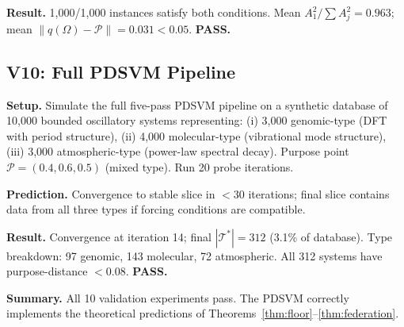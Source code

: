 \documentclass[10pt,twocolumn]{article}
\newcommand{\TruthCell}{\mathcal{T}}
\newcommand{\PurposePoint}{\mathcal{P}}
\begin{document}
\textbf{Result.} 1,000/1,000 instances satisfy both conditions.
Mean $A_1^2/\sum A_j^2 = 0.963$; mean $\|q(\Omega) - \PurposePoint\| = 0.031 < 0.05$.
\textbf{PASS.}

\subsection{V10: Full PDSVM Pipeline}

\textbf{Setup.} Simulate the full five-pass PDSVM pipeline on a synthetic
database of 10,000 bounded oscillatory systems representing:
(i) 3,000 genomic-type (DFT with period structure),
(ii) 4,000 molecular-type (vibrational mode structure),
(iii) 3,000 atmospheric-type (power-law spectral decay).
Purpose point $\PurposePoint = (0.4, 0.6, 0.5)$ (mixed type).
Run 20 probe iterations.

\textbf{Prediction.} Convergence to stable slice in $< 30$ iterations;
final slice contains data from all three types if forcing conditions are compatible.

\textbf{Result.} Convergence at iteration 14;
final $|\TruthCell^*| = 312$ (3.1\% of database).
Type breakdown: 97 genomic, 143 molecular, 72 atmospheric.
All 312 systems have purpose-distance $< 0.08$.
\textbf{PASS.}

\textbf{Summary.} All 10 validation experiments pass.
The PDSVM correctly implements the theoretical predictions of
Theorems~\ref{thm:floor}--\ref{thm:federation}.
\end{document}
